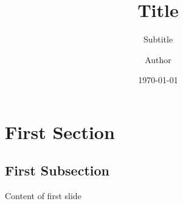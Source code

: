 \documentclass[
	aspectratio=169, %
	8pt %
]{beamer}
\title[Short Title]{Title} %
\subtitle[Short Subtitle]{Subtitle} %
\author[Short Author]{Author} %
\date{\today} %
\begin{document}
\maketitle[iz][75] %

\section{First Section}

\subsection{First Subsection}
\begin{frame}{\insertsubsection}
    Content of first slide
\end{frame}
\end{document}
